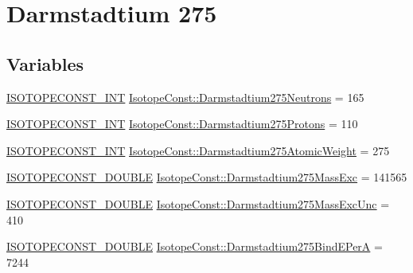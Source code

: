 \hypertarget{group___isotope_const-_darmstadtium-_ds275}{}\section{Darmstadtium 275}
\label{group___isotope_const-_darmstadtium-_ds275}
\subsection*{Variables}
\begin{DoxyCompactItemize}
\item 
\mbox{\hyperlink{group___isotope_const-_macros_ga5f18360b3e99483a35c32d789e62621c}{I\+S\+O\+T\+O\+P\+E\+C\+O\+N\+S\+T\+\_\+\+I\+NT}} \mbox{\hyperlink{group___isotope_const-_darmstadtium-_ds275_gaeec3f68716923954637df00cdc3baf2b}{Isotope\+Const\+::\+Darmstadtium275\+Neutrons}} = 165
\item 
\mbox{\hyperlink{group___isotope_const-_macros_ga5f18360b3e99483a35c32d789e62621c}{I\+S\+O\+T\+O\+P\+E\+C\+O\+N\+S\+T\+\_\+\+I\+NT}} \mbox{\hyperlink{group___isotope_const-_darmstadtium-_ds275_gaa976287499e2f35b4fc717db7f9c6325}{Isotope\+Const\+::\+Darmstadtium275\+Protons}} = 110
\item 
\mbox{\hyperlink{group___isotope_const-_macros_ga5f18360b3e99483a35c32d789e62621c}{I\+S\+O\+T\+O\+P\+E\+C\+O\+N\+S\+T\+\_\+\+I\+NT}} \mbox{\hyperlink{group___isotope_const-_darmstadtium-_ds275_gacf664a19ba251e5251252a6789c54dd2}{Isotope\+Const\+::\+Darmstadtium275\+Atomic\+Weight}} = 275
\item 
\mbox{\hyperlink{group___isotope_const-_macros_ga8f45a7272ce02c0b4c65c44636ed719a}{I\+S\+O\+T\+O\+P\+E\+C\+O\+N\+S\+T\+\_\+\+D\+O\+U\+B\+LE}} \mbox{\hyperlink{group___isotope_const-_darmstadtium-_ds275_gafebb6562008ba5a830bb3ce60a0ee87c}{Isotope\+Const\+::\+Darmstadtium275\+Mass\+Exc}} = 141565
\item 
\mbox{\hyperlink{group___isotope_const-_macros_ga8f45a7272ce02c0b4c65c44636ed719a}{I\+S\+O\+T\+O\+P\+E\+C\+O\+N\+S\+T\+\_\+\+D\+O\+U\+B\+LE}} \mbox{\hyperlink{group___isotope_const-_darmstadtium-_ds275_gaecd1ccb4c1d77c364644e6a6cd4083e6}{Isotope\+Const\+::\+Darmstadtium275\+Mass\+Exc\+Unc}} = 410
\item 
\mbox{\hyperlink{group___isotope_const-_macros_ga8f45a7272ce02c0b4c65c44636ed719a}{I\+S\+O\+T\+O\+P\+E\+C\+O\+N\+S\+T\+\_\+\+D\+O\+U\+B\+LE}} \mbox{\hyperlink{group___isotope_const-_darmstadtium-_ds275_gadd34655672fa75ebf08e4d55c7bc333e}{Isotope\+Const\+::\+Darmstadtium275\+Bind\+E\+PerA}} = 7244

\end{DoxyCompactItemize}
